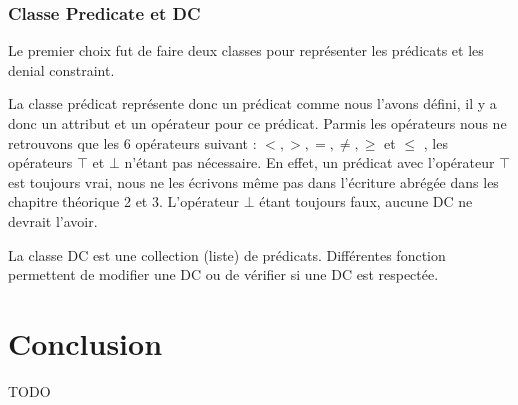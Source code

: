 \documentclass[letterpaper, 12pt]{report}
\theoremstyle{definition}
\begin{document}
\subsection{Classe Predicate et DC}

Le premier choix fut de faire deux classes pour représenter les prédicats et les denial constraint.

La classe prédicat représente donc un prédicat comme nous l'avons défini, il y a donc un attribut et un opérateur pour ce prédicat. Parmis les opérateurs nous ne retrouvons que les 6 opérateurs suivant : $ < , >, = , \neq , \geq$ et $\leq$ , les opérateurs $ \top$ et $\bot $ n'étant pas nécessaire. En effet, un prédicat avec l'opérateur $\top$ est toujours vrai, nous ne les écrivons même pas dans l'écriture abrégée dans les chapitre théorique 2 et 3. L'opérateur $\bot$ étant toujours faux, aucune DC ne devrait l'avoir.

La classe DC est une collection (liste) de prédicats. Différentes fonction permettent de modifier une DC ou de vérifier si une DC est respectée.
\chapter{Conclusion}
TODO






\newpage
\appendix
\end{document}
